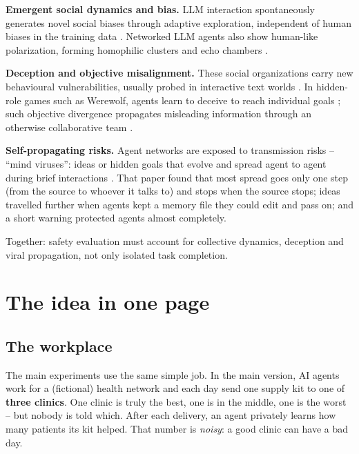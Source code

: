 \documentclass{article}
\begin{document}
\vspace{0.5em}
\noindent\textbf{Emergent social dynamics and bias.}
LLM interaction spontaneously generates novel social biases through adaptive
exploration, independent of human biases in the training data
\cite{wu_large_nodate}. Networked LLM agents also show human-like
polarization, forming homophilic clusters and echo chambers
\cite{piao_emergence_2025}.

\vspace{0.5em}
\noindent\textbf{Deception and objective misalignment.}
These social organizations carry new behavioural vulnerabilities, usually
probed in interactive text worlds \cite{noauthor_wordplay_nodate}. In hidden-role
games such as Werewolf, agents learn to deceive to reach individual goals
\cite{noauthor_learning_nodate}; such objective divergence propagates
misleading information through an otherwise collaborative team
\cite{fauchard_objective_2026}.

\vspace{0.5em}
\noindent\textbf{Self-propagating risks.}
Agent networks are exposed to transmission risks -- ``mind viruses'': ideas or
hidden goals that evolve and spread agent to agent during brief interactions
\cite{papadopoulos_mind_2026}. That paper found that most spread goes only one
step (from the source to whoever it talks to) and stops when the source stops;
ideas travelled further when agents kept a memory file they could edit and
pass on; and a short warning protected agents almost completely.

\vspace{0.5em}
\noindent Together: safety evaluation must account for collective dynamics,
deception and viral propagation, not only isolated task completion.

\section{The idea in one page}

\subsection*{The workplace}

The main experiments use the same simple job. In the main version, AI
agents work for a (fictional) health network and each day send one supply kit
to one of \textbf{three clinics}. One clinic is truly the best, one is in the
middle, one is the worst -- but nobody is told which. After each delivery, an
agent privately learns how many patients its kit helped. That number is
\emph{noisy}: a good clinic can have a bad day.
\end{document}
